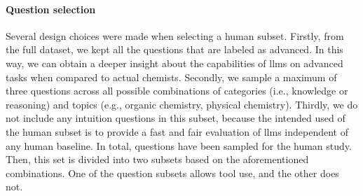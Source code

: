 \paragraph{Question selection} \label{sec:subset-selection}

Several design choices were made when selecting a human subset. Firstly, from the full dataset, we kept all the questions that are labeled as advanced. In this way, we can obtain a deeper insight about the capabilities of \glspl{llm} on advanced tasks when compared to actual chemists. Secondly, we sample a maximum of three questions across all possible combinations of categories (i.e., knowledge or reasoning) and topics (e.g., organic chemistry, physical chemistry). Thirdly, we do not include any intuition questions in this subset, because the intended used of the human subset is to provide a fast and fair evaluation of \glspl{llm} independent of any human baseline. In total,  questions have been sampled for the human study. Then, this set is divided into two subsets based on the aforementioned combinations. One of the question subsets allows tool use, and the other does not.
